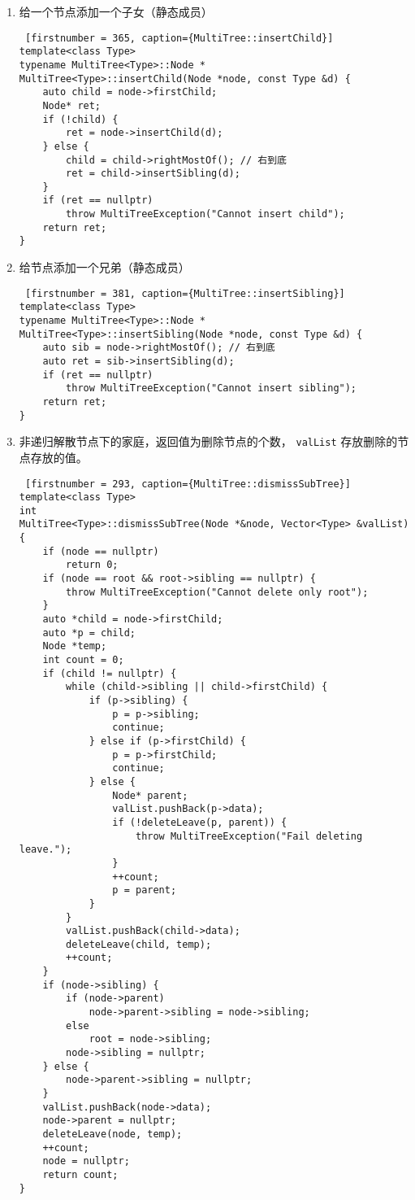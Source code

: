 {
\begin{enumerate}
      \item 给一个节点添加一个子女（静态成员）
\begin{lstlisting} [firstnumber = 365, caption={MultiTree::insertChild}]
template<class Type>
typename MultiTree<Type>::Node *
MultiTree<Type>::insertChild(Node *node, const Type &d) {
    auto child = node->firstChild;
    Node* ret;
    if (!child) {
        ret = node->insertChild(d);
    } else {
        child = child->rightMostOf(); // 右到底
        ret = child->insertSibling(d);
    }
    if (ret == nullptr)
        throw MultiTreeException("Cannot insert child");
    return ret;
} \end{lstlisting}
      \item 给节点添加一个兄弟（静态成员）
\begin{lstlisting} [firstnumber = 381, caption={MultiTree::insertSibling}]
template<class Type>
typename MultiTree<Type>::Node *
MultiTree<Type>::insertSibling(Node *node, const Type &d) {
    auto sib = node->rightMostOf(); // 右到底
    auto ret = sib->insertSibling(d);
    if (ret == nullptr)
        throw MultiTreeException("Cannot insert sibling");
    return ret;
}\end{lstlisting}
    \item 非递归解散节点下的家庭，返回值为删除节点的个数， \lstinline{valList} 存放删除的节点存放的值。
\begin{lstlisting} [firstnumber = 293, caption={MultiTree::dismissSubTree}]
template<class Type>
int
MultiTree<Type>::dismissSubTree(Node *&node, Vector<Type> &valList) {
    if (node == nullptr)
        return 0;
    if (node == root && root->sibling == nullptr) {
        throw MultiTreeException("Cannot delete only root");
    }
    auto *child = node->firstChild;
    auto *p = child;
    Node *temp;
    int count = 0;
    if (child != nullptr) {
        while (child->sibling || child->firstChild) {
            if (p->sibling) {
                p = p->sibling;
                continue;
            } else if (p->firstChild) {
                p = p->firstChild;
                continue;
            } else {
                Node* parent;
                valList.pushBack(p->data);
                if (!deleteLeave(p, parent)) {
                    throw MultiTreeException("Fail deleting leave.");
                }
                ++count;
                p = parent;
            }
        }
        valList.pushBack(child->data);
        deleteLeave(child, temp);
        ++count;
    }
    if (node->sibling) {
        if (node->parent)
            node->parent->sibling = node->sibling;
        else
            root = node->sibling;
        node->sibling = nullptr;
    } else {
        node->parent->sibling = nullptr;
    }
    valList.pushBack(node->data);
    node->parent = nullptr;
    deleteLeave(node, temp);
    ++count;
    node = nullptr;
    return count;
}\end{lstlisting}

\end{enumerate}
}

